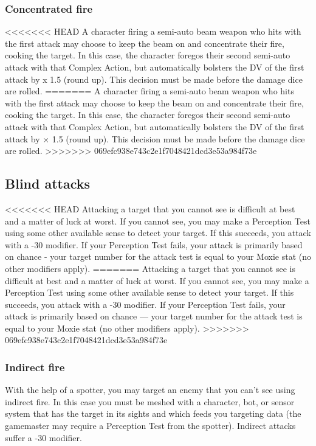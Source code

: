 \subsubsection{Concentrated fire}

<<<<<<< HEAD
A character firing a semi-auto beam weapon who hits with the first attack may choose to keep the beam on and concentrate their fire, cooking the target. In this case, the character foregos their second semi-auto attack with that Complex Action, but automatically bolsters the DV of the first attack by x 1.5 (round up). This decision must be made before the damage dice are rolled.
=======
A character firing a semi-auto beam weapon who hits with the first attack may choose to keep the beam on and concentrate their fire, cooking the target. In this case, the character foregos their second semi-auto attack with that Complex Action, but automatically bolsters the DV of the first attack by $\times$ 1.5 (round up). This decision must be made before the damage dice are rolled.
>>>>>>> 069efc938e743c2e1f7048421dcd3e53a984f73e


\subsection{Blind attacks}
\label{sec:blind-attacks}

<<<<<<< HEAD
Attacking a target that you cannot see is difficult at best and a matter of luck at worst. If you cannot see, you may make a Perception Test using some other available sense to detect your target. If this succeeds, you attack with a -30 modifier. If your Perception Test fails, your attack is primarily based on chance - your target number for the attack test is equal to your Moxie stat (no other modifiers apply).
=======
Attacking a target that you cannot see is difficult at best and a matter of luck at worst. If you cannot see, you may make a Perception Test using some other available sense to detect your target. If this succeeds, you attack with a -30 modifier. If your Perception Test fails, your attack is primarily based on chance --- your target number for the attack test is equal to your Moxie stat (no other modifiers apply).
>>>>>>> 069efc938e743c2e1f7048421dcd3e53a984f73e

\subsubsection{Indirect fire}

With the help of a spotter, you may target an enemy that you can’t see using indirect fire. In this case you must be meshed with a character, bot, or sensor system that has the target in its sights and which feeds you targeting data (the gamemaster may require a Perception Test from the spotter). Indirect attacks suffer a -30 modifier.


